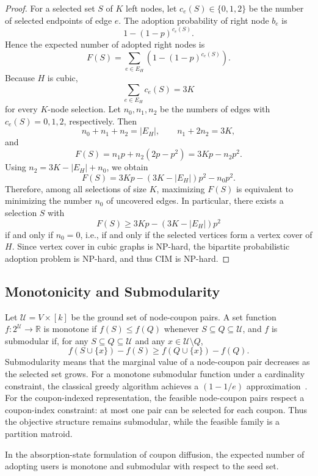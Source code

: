 \documentclass[sigconf]{acmart}
\begin{document}
\begin{proof}
For a selected set $S$ of $K$ left nodes, let
$c_e(S)\in\{0,1,2\}$ be the number of selected endpoints of edge $e$.
The adoption probability of right node $b_e$ is
\[
  1-(1-p)^{c_e(S)}.
\]
Hence the expected number of adopted right nodes is
\[
  F(S)=\sum_{e\in E_H}\left(1-(1-p)^{c_e(S)}\right).
\]
Because $H$ is cubic,
\[
  \sum_{e\in E_H} c_e(S)=3K
\]
for every $K$-node selection.
Let $n_0,n_1,n_2$ be the numbers of edges with
$c_e(S)=0,1,2$, respectively.
Then
\[
  n_0+n_1+n_2=|E_H|,
  \qquad
  n_1+2n_2=3K,
\]
and
\[
  F(S)=n_1p+n_2(2p-p^2)
      =3Kp-n_2p^2.
\]
Using $n_2=3K-|E_H|+n_0$, we obtain
\[
  F(S)=3Kp-(3K-|E_H|)p^2-n_0p^2 .
\]
Therefore, among all selections of size $K$, maximizing $F(S)$ is
equivalent to minimizing the number $n_0$ of uncovered edges.
In particular, there exists a selection $S$ with
\[
  F(S)\geq 3Kp-(3K-|E_H|)p^2
\]
if and only if $n_0=0$, i.e., if and only if the selected vertices form
a vertex cover of $H$.
Since vertex cover in cubic graphs is NP-hard, the bipartite
probabilistic adoption problem is NP-hard, and thus CIM is NP-hard.
\end{proof}   

\subsection{Monotonicity and Submodularity}

Let $\mathcal{U}=V\times[k]$ be the ground set of node-coupon pairs.
A set function $f:2^{\mathcal{U}}\to\mathbb{R}$ is monotone if
$f(S)\leq f(Q)$ whenever $S\subseteq Q\subseteq\mathcal{U}$, and $f$ is
submodular if, for any $S\subseteq Q\subseteq\mathcal{U}$ and any
$x\in\mathcal{U}\setminus Q$,
\[
  f(S\cup\{x\})-f(S) \geq f(Q\cup\{x\})-f(Q).
\]
Submodularity means that the marginal value of a node-coupon pair
decreases as the selected set grows.
For a monotone submodular function under a cardinality constraint, the
classical greedy algorithm achieves a $(1-1/e)$
approximation~\cite{nemhauser1978analysis}.
For the coupon-indexed representation, the feasible node-coupon pairs
respect a coupon-index constraint: at most one pair can be selected for
each coupon.
Thus the objective structure remains submodular, while the feasible
family is a partition matroid.

\begin{theorem}
\label{thm:monosub}
In the absorption-state formulation of coupon diffusion, the expected
number of adopting users is monotone and submodular with respect to the
seed set.
\end{theorem}
\end{document}
